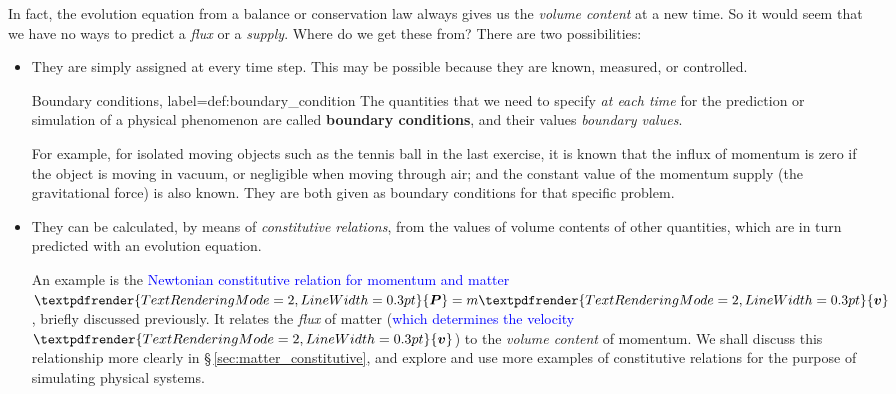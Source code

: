 \documentclass[a4paper,12pt,%
onecolumn,oneside,%
british%
]{memoir}
\renewcommand*{\bm}[1]{\textpdfrender{TextRenderingMode=2,LineWidth=0.3pt}{\boldsymbol{#1}}}
\renewcommand*{\|}[1][]{\nonscript\:#1\vert\nonscript\:\mathopen{}}
\newcommand*{\sect}{\S}%
\renewcommand*{\autoref}[2]{\sidepar{\vspace{-1ex}\footnotesize{\color{blue}\faIcon{%
angle-right%
}\enspace\sect\,\ref{#1} page\,\pageref{#1}}}\textcolor{blue}{#2}}
\newcommand*{\yv}{\bm{v}}
\newcommand*{\yM}{m}%
\newcommand*{\yP}{\bm{P}}
\begin{document}
In fact, the evolution equation from a balance or conservation law always gives us the \emph{volume content} at a new time. So it would seem that we have no ways to predict a \emph{flux} or a \emph{supply}. Where do we get these from? There are two possibilities:
\begin{itemize}[para]
\item They are simply assigned at every time step. This may be possible because they are known, measured, or controlled.
  \begin{definition}{Boundary conditions, label={def:boundary_condition}}
    The quantities that we need to specify \emph{at each time} for the prediction or simulation of a physical phenomenon are called \textbf{boundary conditions}, and their values \emph{boundary values}.
  \end{definition}

  For example, for isolated moving objects such as the tennis ball in the last exercise, it is known that the influx of momentum is zero if the object is moving in vacuum, or negligible when moving through air; and the constant value of the momentum supply (the gravitational force) is also known. They are both given as boundary conditions for that specific problem.

\item They can be calculated, by means of \emph{constitutive relations}, from the values of volume contents of other quantities, which are in turn predicted with an evolution equation.

  An example is the \autoref{item:momentum_mass_velocity}{Newtonian constitutive relation for momentum and matter} $\yP = \yM\yv$, briefly discussed previously. It relates the \emph{flux} of matter (\autoref{sec:fluxes_velocities}{which determines the velocity $\yv$}) to the \emph{volume content} of momentum. We shall discuss this relationship more clearly in \sect\,\ref{sec:matter_constitutive}, and explore and use more examples of constitutive relations for the purpose of simulating physical systems.
\end{itemize}
\end{document}
